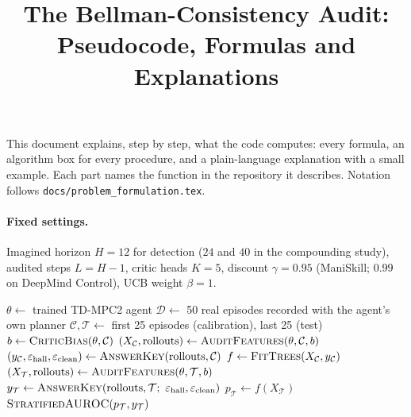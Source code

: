 \documentclass[11pt]{article}
\title{The Bellman-Consistency Audit:\\Pseudocode, Formulas and Explanations}
\author{}
\date{}
\newcommand{\code}[1]{\texttt{#1}}
\begin{document}
\maketitle

\noindent
This document explains, step by step, what the code computes: every formula, an algorithm box for every procedure,
and a plain-language explanation with a small example. Each part names the function in the repository it
describes. Notation follows \code{docs/problem\_formulation.tex}.

\paragraph{Fixed settings.} Imagined horizon $H=12$ for detection ($24$ and $40$ in the compounding study), audited
steps $L=H-1$, critic heads $K=5$, discount $\gamma=0.95$ (ManiSkill; $0.99$ on DeepMind Control), UCB weight
$\beta=1$.

\tableofcontents
\bigskip

\begin{algorithm}[h]
\caption{End-to-end, for one trained robot}\label{alg:e2e}
\begin{algorithmic}[1]
\State $\theta\gets$ trained TD-MPC2 agent 
\State $\mathcal{D}\gets$ 50 real episodes recorded with the agent's own planner 
\State $\mathcal{C},\mathcal{T}\gets$ first 25 episodes (calibration), last 25 (test)
\State $b\gets\textsc{CriticBias}(\theta,\mathcal{C})$ 
\State $(X_{\mathcal C},\text{rollouts})\gets\textsc{AuditFeatures}(\theta,\mathcal{C},b)$ 
\State $(y_{\mathcal C},\varepsilon_{\text{hall}},\varepsilon_{\text{clean}})\gets\textsc{AnswerKey}(\text{rollouts},\mathcal{C})$ 
\State $f\gets\textsc{FitTrees}(X_{\mathcal C},y_{\mathcal C})$ 
\State $(X_{\mathcal T},\text{rollouts})\gets\textsc{AuditFeatures}(\theta,\mathcal{T},b)$ 
\State $y_{\mathcal T}\gets\textsc{AnswerKey}(\text{rollouts},\mathcal{T};\ \varepsilon_{\text{hall}},\varepsilon_{\text{clean}})$ 
\State $p_{\mathcal T}\gets f(X_{\mathcal T})$ 
\State \Return $\textsc{StratifiedAUROC}(p_{\mathcal T},y_{\mathcal T})$ 
\end{algorithmic}
\end{algorithm}
\end{document}
